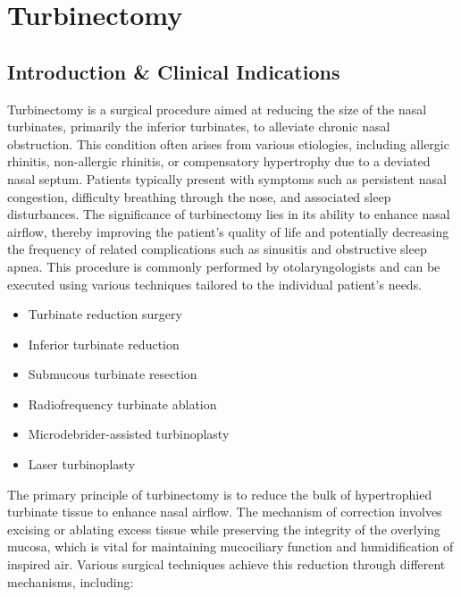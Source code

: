 \chapter{Turbinectomy}

\section*{Introduction \& Clinical Indications}
Turbinectomy is a surgical procedure aimed at reducing the size of the nasal turbinates, primarily the inferior turbinates, to alleviate chronic nasal obstruction. This condition often arises from various etiologies, including allergic rhinitis, non-allergic rhinitis, or compensatory hypertrophy due to a deviated nasal septum. Patients typically present with symptoms such as persistent nasal congestion, difficulty breathing through the nose, and associated sleep disturbances. The significance of turbinectomy lies in its ability to enhance nasal airflow, thereby improving the patient's quality of life and potentially decreasing the frequency of related complications such as sinusitis and obstructive sleep apnea. This procedure is commonly performed by otolaryngologists and can be executed using various techniques tailored to the individual patient's needs.

\begin{itemize}
  \item Turbinate reduction surgery
  \item Inferior turbinate reduction
  \item Submucous turbinate resection
  \item Radiofrequency turbinate ablation
  \item Microdebrider-assisted turbinoplasty
  \item Laser turbinoplasty
\end{itemize}

The primary principle of turbinectomy is to reduce the bulk of hypertrophied turbinate tissue to enhance nasal airflow. The mechanism of correction involves excising or ablating excess tissue while preserving the integrity of the overlying mucosa, which is vital for maintaining mucociliary function and humidification of inspired air. Various surgical techniques achieve this reduction through different mechanisms, including:

